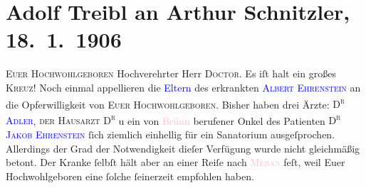 

               \section[Adolf Treibl an Arthur Schnitzler, 18. 1. 1906]{ Adolf Treibl an Arthur Schnitzler, 18. 1. 1906}\nopagebreak{}\rehead{ }\normalsize\beginnumbering{} \toendnotes[C]{\smallbreak\pagebreak[2]} 
\toendnotes[C]{\smallbreak}\pstart
           \noindent{}{\pb}\textsc{Euer Hochwohlgeboren}\pend
           \pstart{}Hochverehrter Herr \textsc{Doctor}.\pend\pstart
           Es iſt halt ein großes \textsc{Kreuz}! Noch einmal appellieren die
                  \textcolor{blue}{Eltern}{} des erkrankten
                  \textsc{\textcolor{blue}{Albert Ehrenstein}{}\ledrightnote{\textcolor{blue}{Albert Ehrenstein}}} an die Opferwilligkeit von \textsc{Euer Hochwohlgeboren}.
               Bisher haben drei Ärzte: \textsc{D\textsuperscript{r}{ }\textcolor{blue}{Adler}{}\ledrightnote{\textcolor{blue}{Alfred Adler}}}, \textsc{der Hausarzt D\textsuperscript{r}}{ }\label{K_L01574_1v}\label{K_L01574_1h} u ein von \textcolor{pink}{Brünn}{}\ledrightnote{\textcolor{pink}{Brünn}} berufener Onkel des Patienten \textsc{D\textsuperscript{r}{ }\textcolor{blue}{Jakob Ehrenstein}{}\ledrightnote{\textcolor{blue}{Jakob Ehrenstein}}}{ }ſich ziemlich einhellig  für ein Sanatorium aus{\pb}geſprochen.
               Allerdings  der Grad der Notwendigkeit dieſer
               Verfügung wurde nicht gleichmäßig betont. Der Kranke ſelbſt hält aber an einer Reiſe
               nach \textsc{\textcolor{pink}{Meran}{}\ledrightnote{\textcolor{pink}{Meran}}} feſt, weil Euer Hochwohlgeboren eine ſolche ſeinerzeit empfohlen haben.\pend
